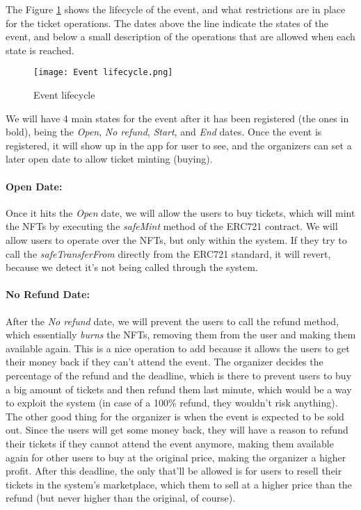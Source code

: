The Figure \ref{fig:event_lifecycle} shows the lifecycle of the event, and what
restrictions are in place for the ticket operations. The dates above the line
indicate the states of the event, and below a small description of the
operations that are allowed when each state is reached.

\begin{figure}[H]
	\texttt{[image: Event lifecycle.png]}
	\centering
	\caption{Event lifecycle}
	\label{fig:event_lifecycle}
\end{figure}

We will have 4 main states for the event after it has been registered (the ones
in bold), being the \textit{Open}, \textit{No refund}, \textit{Start}, and
\textit{End} dates. Once the event is registered, it will show up in the app
for user to see, and the organizers can set a later open date to allow ticket
minting (buying).

\paragraph{Open Date:} Once it hits the \textit{Open} date, we will allow the users to buy tickets,
which will mint the NFTs by executing the \textit{safeMint} method of the
ERC721 contract. We will allow users to operate over the NFTs, but only within
the system. If they try to call the \textit{safeTransferFrom} directly from the
ERC721 standard, it will revert, because we detect it's not being called
through the system.

\paragraph{No Refund Date:} After the \textit{No refund} date, we will prevent the users to call the refund
method, which essentially \textit{burns} the NFTs, removing them from the user
and making them available again. This is a nice operation to add because it
allows the users to get their money back if they can't attend the event. The
organizer decides the percentage of the refund and the deadline, which is there
to prevent users to buy a big amount of tickets and then refund them last
minute, which would be a way to exploit the system (in case of a 100\% refund,
they wouldn't risk anything). The other good thing for the organizer is when
the event is expected to be sold out. Since the users will get some money back,
they will have a reason to refund their tickets if they cannot attend the event
anymore, making them available again for other users to buy at the original
price, making the organizer a higher profit. After this deadline, the only
that'll be allowed is for users to resell their tickets in the system's
marketplace, which them to sell at a higher price than the refund (but never
higher than the original, of course).

